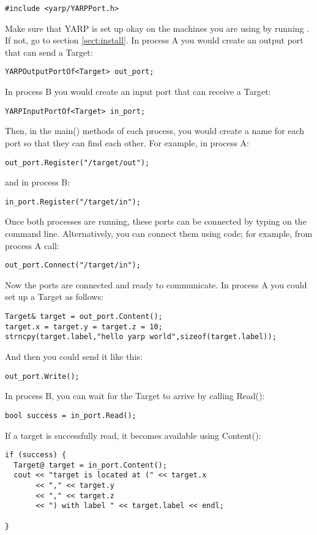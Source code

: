 \begin{verbatim}
#include <yarp/YARPPort.h>
\end{verbatim}
%
Make sure that YARP is set up okay on the machines you are using by 
running .  If not, go to section \ref{sect:install}.
%
In process A you would create an output port that can send a Target:
%
\begin{verbatim}
YARPOutputPortOf<Target> out_port;
\end{verbatim}
%
%
In process B you would create an input port that can receive a Target:
%
\begin{verbatim}
YARPInputPortOf<Target> in_port;
\end{verbatim}
%
Then, in the main() methods of each process, you would create a name
for each port so that they can find each other.  For example, in
process A:
%
\begin{verbatim}
out_port.Register("/target/out");
\end{verbatim}
%
and in process B:
%
\begin{verbatim}
in_port.Register("/target/in");
\end{verbatim}
%
Once both processes are running, these ports can be connected by
typing  on the command line.
Alternatively, you can connect them using code; for example, from
process A call:
%
\begin{verbatim}
out_port.Connect("/target/in");
\end{verbatim}
%
Now the ports are connected and ready to communicate.  In process A
you could set up a Target as follows:
%
\begin{verbatim}
Target& target = out_port.Content();
target.x = target.y = target.z = 10;
strncpy(target.label,"hello yarp world",sizeof(target.label));
\end{verbatim}
%
And then you could send it like this:
%
\begin{verbatim}
out_port.Write();
\end{verbatim}
%
In process B, you can wait for the Target to arrive by calling Read():
%
\begin{verbatim}
bool success = in_port.Read();
\end{verbatim}
%
If a target is successfully read, it becomes available using Content():
%
\begin{verbatim}
if (success) {
  Target@ target = in_port.Content();
  cout << "target is located at (" << target.x
       << "," << target.y
       << "," << target.z
       << ") with label " << target.label << endl;

}
\end{verbatim}

